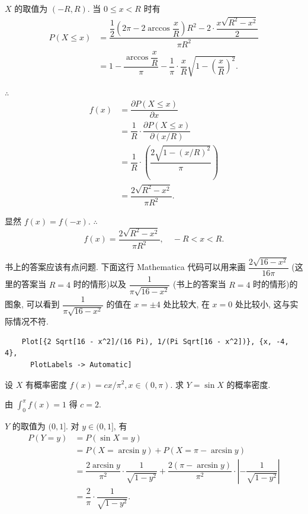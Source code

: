 \documentclass[color=black,device=normal,lang=cn]{elegantnote}
\numberwithin{equation}{section}
\theoremstyle{plain}
\numberwithin{exercise}{exsection}
\begin{document}
\begin{solution}
    $X$ 的取值为 $(-R,R)$. 当 $0\leq x<R$ 时有
    \begin{align*}
        P(X\leq x) & =\dfrac{\dfrac{1}{2}\left(2\pi-2\arccos\dfrac{x}{R}\right)R^2-2\cdot\dfrac{x\sqrt{R^2-x^2}}{2}}{\pi R^2} \\
        & =1-\dfrac{\arccos\dfrac{x}{R}}{\pi}-\dfrac{1}{\pi}\cdot\dfrac{x}{R}\sqrt{1-\left(\dfrac{x}{R}\right)^2}.
    \end{align*}

    $\therefore$
    \begin{align*}
        f(x) & =\dfrac{\partial P(X\leq x)}{\partial x} \\
        & =\dfrac{1}{R}\cdot\dfrac{\partial P(X\leq x)}{\partial (x/R)} \\
        & =\dfrac{1}{R}\cdot\left(\dfrac{2\sqrt{1-(x/R)^2}}{\pi}\right) \\
        & =\dfrac{2\sqrt{R^2-x^2}}{\pi R^2}.
    \end{align*}

    显然 $f(x)=f(-x)$. $\therefore$
    \[f(x)=\dfrac{2\sqrt{R^2-x^2}}{\pi R^2},\quad-R<x<R.\]
\end{solution}
\begin{note}
    书上的答案应该有点问题. 下面这行 Mathematica 代码可以用来画 $\dfrac{2\sqrt{16-x^2}}{16\pi}$ (这里的答案当 $R=4$ 时的情形)以及 $\dfrac{1}{\pi\sqrt{16-x^2}}$ (书上的答案当 $R=4$ 时的情形)的图象, 可以看到 $\dfrac{1}{\pi\sqrt{16-x^2}}$ 的值在 $x=\pm4$ 处比较大, 在 $x=0$ 处比较小, 这与实际情况不符.
    \begin{lstlisting}
    Plot[{2 Sqrt[16 - x^2]/(16 Pi), 1/(Pi Sqrt[16 - x^2])}, {x, -4, 4}, 
      PlotLabels -> Automatic]
    \end{lstlisting}
\end{note}
\begin{exercise}%
    设 $X$ 有概率密度 $f(x)=cx/\pi^2,x\in(0,\pi)$. 求 $Y=\sin X$ 的概率密度.
\end{exercise}
\begin{solution}
    由 $\int_0^\pi f(x)=1$ 得 $c=2$.

    $Y$ 的取值为 $(0,1]$. 对 $y\in(0,1]$, 有
    \begin{align*}
        P(Y=y) & =P(\sin X=y) \\
        & =P(X=\arcsin y)+P(X=\pi-\arcsin y) \\
        & =\dfrac{2\arcsin y}{\pi^2}\cdot\dfrac{1}{\sqrt{1-y^2}}+\dfrac{2(\pi-\arcsin y)}{\pi^2}\cdot\left|-\dfrac{1}{\sqrt{1-y^2}}\right| \\
        & =\dfrac{2}{\pi}\cdot\dfrac{1}{\sqrt{1-y^2}}.
    \end{align*}
\end{solution}
\end{document}
